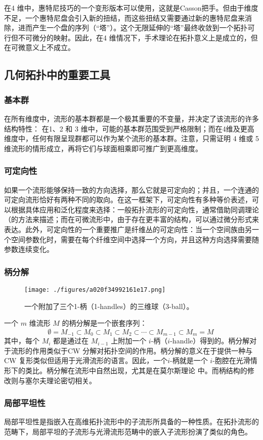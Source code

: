 在4 维中，惠特尼技巧的一个变形版本可以使用，这就是Casson把手。但由于维度不足，一个惠特尼盘会引入新的扭结，而这些扭结又需要通过新的惠特尼盘来消除，进而产生一个盘的序列（“塔”）。这个无限延伸的“塔”最终收敛到一个拓扑可行但不可微分的映射。因此，在4 维情况下，手术理论在拓扑意义上是成立的，但在可微意义上不成立。
\subsection{几何拓扑中的重要工具}
\subsubsection{基本群}
在所有维度中，流形的基本群都是一个极其重要的不变量，并决定了该流形的许多结构特性：
在1、2 和 3 维中，可能的基本群范围受到严格限制；而在4维及更高维度中，任何有限呈现群都可以作为某个流形的基本群。注意，只需证明 4 维或 5 维流形的情形成立，再将它们与球面相乘即可推广到更高维度。
\subsubsection{可定向性}
如果一个流形能够保持一致的方向选择，那么它就是可定向的；并且，一个连通的可定向流形恰好有两种不同的取向。在这一框架下，可定向性有多种等价表述，可以根据具体应用和泛化程度来选择：一般拓扑流形的可定向性，通常借助同调理论（的方法来描述；而在可微流形中，由于存在更丰富的结构，可以通过微分形式来表达。此外，可定向性的一个重要推广是纤维丛的可定向性：当一个空间族由另一个空间参数化时，需要在每个纤维空间中选择一个方向，并且这种方向选择需要随参数连续变化。
\subsubsection{柄分解}
\begin{figure}[ht]
\centering
\texttt{[image: ./figures/a020f34992161e17.png]}
\caption{一个附加了三个1-柄（1-handles）的三维球（3-ball）。} \label{fig_JHtpx_4}
\end{figure}
一个 $m$ 维流形 $M$ 的柄分解是一个嵌套序列：
$$
\emptyset = M_{-1} \subset M_0 \subset M_1 \subset M_2 \subset \cdots \subset M_{m-1} \subset M_m = M~
$$
其中，每个 $M_i$ 都是通过在 $M_{i-1}$ 上附加一个 $i$-柄（$i$-handle）得到的。柄分解对于流形的作用类似于CW 分解对拓扑空间的作用。柄分解的意义在于提供一种与CW 复形类似但适用于光滑流形的语言。因此，一个$i$-柄就是一个 $i$-胞腔在光滑情形下的类比。柄分解在流形中自然出现，尤其是在莫尔斯理论 中。而柄结构的修改则与塞尔夫理论密切相关。
\subsubsection{局部平坦性}
局部平坦性是指嵌入在高维拓扑流形中的子流形所具备的一种性质。在拓扑流形的范畴下，局部平坦的子流形与光滑流形范畴中的嵌入子流形扮演了类似的角色。

